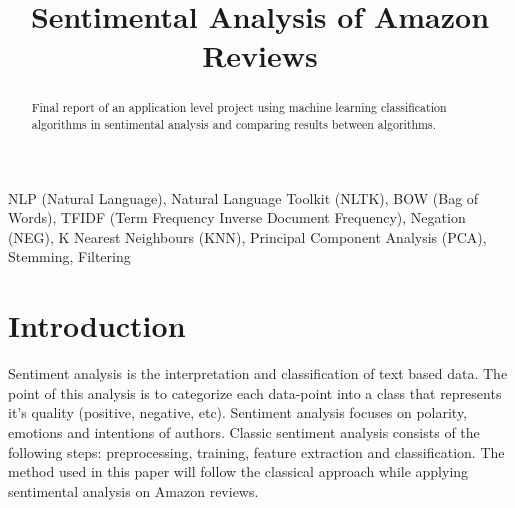 \documentclass[conference]{IEEEtran}
\begin{document}
\title{Sentimental Analysis of Amazon Reviews\\
}

\author{
\and
{}
\and
{}
}

\maketitle

\begin{abstract}
Final report of an application level project using machine learning classification algorithms in sentimental analysis and comparing results between algorithms. 
\end{abstract}

\begin{IEEEkeywords}
NLP (Natural Language), Natural Language Toolkit (NLTK), BOW (Bag of Words), TFIDF (Term Frequency Inverse Document Frequency), Negation (NEG), K Nearest Neighbours (KNN), Principal Component Analysis (PCA), Stemming, Filtering
\end{IEEEkeywords}

\section{Introduction}
Sentiment analysis is the interpretation and classification of text based data. The point of this analysis is to categorize each data-point into a class that represents it’s quality (positive, negative, etc). Sentiment analysis focuses on polarity, emotions and intentions of authors. Classic sentiment analysis consists of the following steps: preprocessing, training, feature extraction and classification. The method used in this paper will follow the classical approach while applying sentimental analysis on Amazon reviews.
\end{document}
